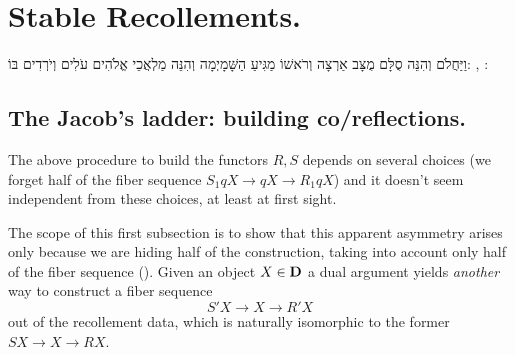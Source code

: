 \section{Stable Recollements.}\label{stabrecoll}
\HebrewEpigraph
{וַיַּחֲלֹם וְהִנֵּה סֻלָּם מֻצָּב אַרְצָה וְרֹאשׁוֹ מַגִּיעַ הַשָּׁמָיְמָה וְהִנֵּה מַלְאֲכֵי אֱלֹהִים עֹלִים וְיֹרְדִים בּוֹ:}
{\cite{BHS},  :}
\subsection{The Jacob's ladder: building co\fshyp{}reflections.}
The above procedure to build the functors $R,S$ depends on several choices (we forget half of the fiber sequence $S_1 q X\to qX\to R_1 qX$) and it doesn't seem independent from these choices, at least at first sight. 

The scope of this first subsection is to show that this apparent asymmetry arises only because we are hiding half of the construction, taking into account only half of the fiber sequence (). Given an object $X\in \textbf{D}$ a dual argument yields \emph{another} way to construct a fiber sequence
\[
	S' X\to X\to R' X
\]
out of the recollement data, which is naturally isomorphic to the former $SX\to X\to RX$. 

